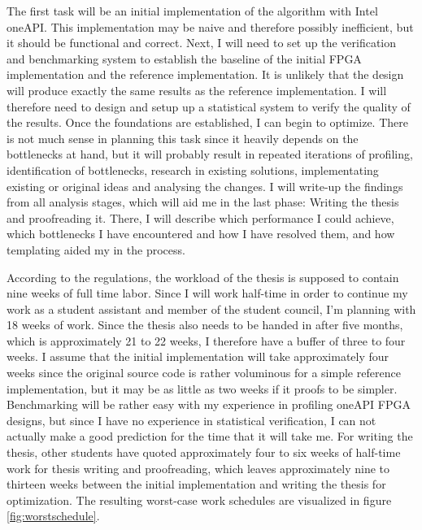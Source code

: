 The first task will be an initial implementation of the algorithm with Intel oneAPI. This implementation may be naive and therefore possibly inefficient, but it should be functional and correct. Next, I will need to set up the verification and benchmarking system to establish the baseline of the initial FPGA implementation and the reference implementation. It is unlikely that the design will produce exactly the same results as the reference implementation. I will therefore need to design and setup up a statistical system to verify the quality of the results. Once the foundations are established, I can begin to optimize. There is not much sense in planning this task since it heavily depends on the bottlenecks at hand, but it will probably result in repeated iterations of profiling, identification of bottlenecks, research in existing solutions, implementating existing or original ideas and analysing the changes. I will write-up the findings from all analysis stages, which will aid me in the last phase: Writing the thesis and proofreading it. There, I will describe which performance I could achieve, which bottlenecks I have encountered and how I have resolved them, and how templating aided my in the process.

According to the regulations, the workload of the thesis is supposed to contain nine weeks of full time labor. Since I will work half-time in order to continue my work as a student assistant and member of the student council, I'm planning with 18 weeks of work. Since the thesis also needs to be handed in after five months, which is approximately 21 to 22 weeks, I therefore have a buffer of three to four weeks. I assume that the initial implementation will take approximately four weeks since the original source code is rather voluminous for a simple reference implementation, but it may be as little as two weeks if it proofs to be simpler. Benchmarking will be rather easy with my experience in profiling oneAPI FPGA designs, but since I have no experience in statistical verification, I can not actually make a good prediction for the time that it will take me. For writing the thesis, other students have quoted approximately four to six weeks of half-time work for thesis writing and proofreading, which leaves approximately nine to thirteen weeks between the initial implementation and writing the thesis for optimization. The resulting worst-case work schedules are visualized in figure \ref{fig:worstschedule}.
